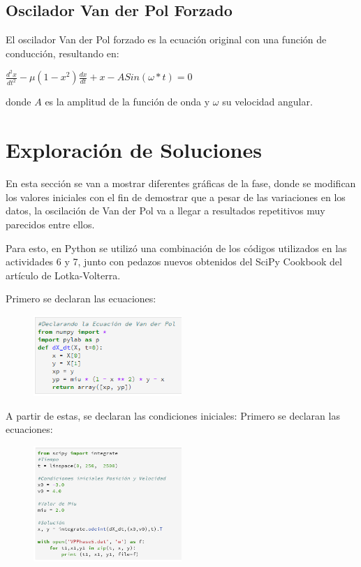 \documentclass[a4paper]{article}
\begin{document}
\subsection{Oscilador Van der Pol Forzado}

El oscilador Van der Pol forzado es la ecuación original con una función de conducción, resultando en:

\begin{center}
$\frac{d^2x}{dt^2} - \mu(1 - x^2)\frac{dx}{dt} + x - ASin(\omega*t) = 0$
\end{center}

donde $A$ es la amplitud de la función de onda y $\omega$ su velocidad angular. 

\section{Exploración de Soluciones}
En esta sección se van a mostrar diferentes gráficas de la fase, donde se modifican los valores iniciales con el fin de demostrar que a pesar de las variaciones en los datos, la oscilación de Van der Pol va a llegar a resultados repetitivos muy parecidos entre ellos.

Para esto, en Python se utilizó una combinación de los códigos utilizados en las actividades 6 y 7, junto con pedazos nuevos obtenidos del SciPy Cookbook del artículo de Lotka-Volterra.

Primero se declaran las ecuaciones:
\begin{figure}[ht!]
 \centering
  \includegraphics[width=0.5\textwidth]{Codigo1.PNG}
\end{figure}

\pagebreak

A partir de estas, se declaran las condiciones iniciales:
Primero se declaran las ecuaciones:
\begin{figure}[ht!]
 \centering
  \includegraphics[width=0.5\textwidth]{CodigoEx1.png}
\end{figure}
\end{document}
